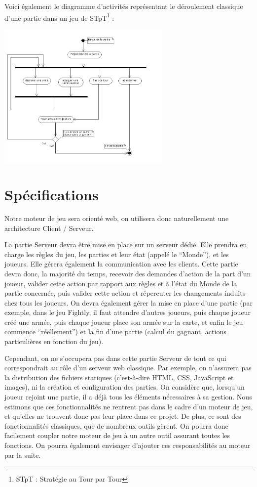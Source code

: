 \documentclass[a4paper,10pt]{report}
\begin{document}
      Voici également le diagramme d'activités représentant le déroulement classique d'une partie dans un jeu de STpT\footnote{STpT : Stratégie au Tour par Tour} : 
      
      \includegraphics[width=320px]{diagrammes/moteuractivites.png}



    \section{Spécifications}

      Notre moteur de jeu sera orienté web, on utilisera donc naturellement une architecture Client / Serveur. 

      La partie Serveur devra être mise en place sur un serveur dédié. Elle prendra en charge les règles du jeu, les parties et leur état (appelé le ``Monde''), et les joueurs. Elle gérera également la communication avec les clients. Cette partie devra donc, la majorité du temps, recevoir des demandes d'action de la part d'un joueur, valider cette action par rapport aux règles et à l'état du Monde de la partie concernée, puis valider cette action et répercuter les changements induits chez tous les joueurs. On devra également gérer la mise en place d'une partie (par exemple, dans le jeu Fightly, il faut attendre d'autres joueurs, puis chaque joueur créé une armée, puis chaque joueur place son armée sur la carte, et enfin le jeu commence ``réellement'') et la fin d'une partie (calcul du gagnant, actions particulières en fonction du jeu). 
      
      Cependant, on ne s'occupera pas dans cette partie Serveur de tout ce qui correspondrait au rôle d'un serveur web classique. Par exemple, on n'assurera pas la distribution des fichiers statiques (c'est-à-dire HTML, CSS, JavaScript et images), ni la création et configuration des parties. On considère que, lorsqu'un joueur rejoint une partie, il a déjà tous les éléments nécessaires à sa gestion. Nous estimons que ces fonctionnalités ne rentrent pas dans le cadre d'un moteur de jeu, et qu'elles ne trouvent donc pas leur place dans ce projet. De plus, ce sont des fonctionnalités classiques, que de nombreux outils gèrent. On pourra donc facilement coupler notre moteur de jeu à un autre outil assurant toutes les fonctions. On pourra également envisager d'ajouter ces responsabilités au moteur par la suite. 
\end{document}
